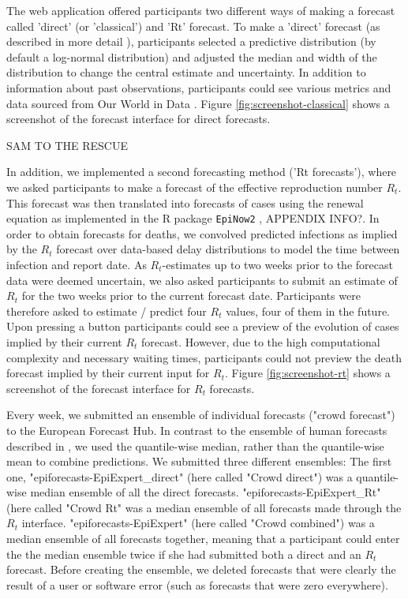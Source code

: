 \documentclass[10pt,a4paper,twocolumn]{article}
\begin{document}
The web application offered participants two different ways of making a forecast called 'direct' (or 'classical') and 'Rt' forecast. To make a 'direct' forecast (as described in more detail \cite{bosseComparingHumanModelbased2022}), participants selected a predictive distribution (by default a log-normal distribution) and adjusted the median and width of the distribution to change the central estimate and uncertainty. In addition to information about past observations, participants could see various metrics and data sourced from Our World in Data \citep{owidcoronavirus}. Figure \ref{fig:screenshot-classical} shows a screenshot of the forecast interface for direct forecasts. 

SAM TO THE RESCUE

In addition, we implemented a second forecasting method ('Rt forecasts'), where we asked participants to make a forecast of the effective reproduction number $R_t$. This forecast was then translated into forecasts of cases using the renewal equation \citep{fraserEstimatingIndividualHousehold2007} as implemented in the \textsf{R} package \texttt{EpiNow2} \citep{epinow2}, APPENDIX INFO?. In order to obtain forecasts for deaths, we convolved predicted infections as implied by the $R_t$ forecast over data-based delay distributions \cite{epinow2, sherrattExploringSurveillanceData2021, abbottEstimatingTimevaryingReproduction2020a} to model the time between infection and report date. As $R_t$-estimates up to two weeks prior to the forecast data were deemed uncertain, we also asked participants to submit an estimate of $R_t$ for the two weeks prior to the current forecast date. Participants were therefore asked to estimate / predict four $R_t$ values, four of them in the future. Upon pressing a button participants could see a preview of the evolution of cases implied by their current $R_t$ forecast. However, due to the high computational complexity and necessary waiting times, participants could not preview the death forecast implied by their current input for $R_t$. Figure \ref{fig:screenshot-rt} shows a screenshot of the forecast interface for $R_t$ forecasts. 

Every week, we submitted an ensemble of individual forecasts ("crowd forecast") to the European Forecast Hub. In contrast to the ensemble of human forecasts described in \citet{bosseComparingHumanModelbased2022}, we used the quantile-wise median, rather than the quantile-wise mean to combine predictions. %
We submitted three different ensembles: The first one, "epiforecasts-EpiExpert\_direct" (here called "Crowd direct") was a quantile-wise median ensemble of all the direct forecasts. "epiforecasts-EpiExpert\_Rt" (here called "Crowd Rt" was a median ensemble of all forecasts made through the $R_t$ interface. "epiforecasts-EpiExpert" (here called "Crowd combined") was a median ensemble of all forecasts together, meaning that a participant could enter the the median ensemble twice if she had submitted both a direct and an $R_t$ forecast. Before creating the ensemble, we deleted forecasts that were clearly the result of a user or software error (such as forecasts that were zero everywhere).
\end{document}
